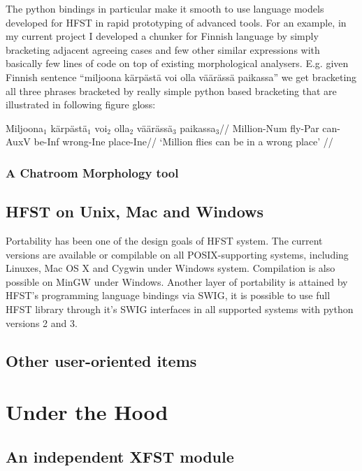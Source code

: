 \documentclass{llncs}
\begin{document}
The python bindings in particular make it smooth to use language models
developed for HFST in rapid prototyping of advanced tools. For an example, in
my current project I developed a chunker for Finnish language by simply
bracketing adjacent agreeing cases and few other similar expressions with
basically few lines of code on top of existing morphological analysers. E.g.
given Finnish sentence ``miljoona kärpästä voi olla väärässä paikassa'' we get
bracketing all three phrases bracketed by really simple python based bracketing
that are illustrated in following figure gloss:

\ex
\begingl
\gla Miljoona$_1$ kärpästä$_1$ voi$_2$ olla$_2$ väärässä$_3$ paikassa$_3$//
\glb Million-{\sc Num} fly-{\sc Par} can-{\sc AuxV} be-{\sc Inf} wrong-{\sc Ine} place-{\sc Ine}//
\glft `Million flies can be in a wrong place' //
\endgl
\xe


\subsubsection{A Chatroom Morphology tool}

\subsection{HFST on Unix, Mac and Windows}

Portability has been one of the design goals of HFST system. The current 
versions are available or compilable on all POSIX-supporting systems, including
Linuxes, Mac OS X and Cygwin under Windows system. Compilation is also possible 
on MinGW under Windows. Another layer of portability
is attained by HFST's programming language bindings via SWIG, it is possible to
use full HFST library through it's SWIG interfaces in all supported systems with
python versions 2 and 3.


\subsection{Other user-oriented items}

\section{Under the Hood}

\subsection{An independent XFST module}
\end{document}
